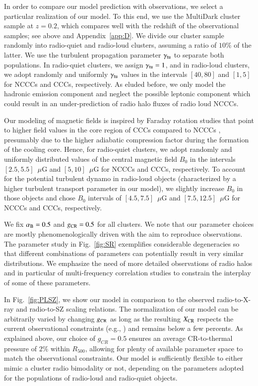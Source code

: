 \documentclass[useAMS,usenatbib]{mn2e}
\begin{document}
In order to compare our model prediction with observations, we select a
particular realization of our model. To this end, we use the MultiDark cluster
sample at $z=0.2$, which compares well with the redshift of the observational
samples; see above and Appendix~\ref{app:D}. We divide our cluster sample
randomly into radio-quiet and radio-loud clusters, assuming a ratio of $10\%$ of
the latter. We use the turbulent propagation parameter $\gamma_{{\mathrm{tu}}}$ to
separate both populations. In radio-quiet clusters, we assign
$\gamma_{{\mathrm{tu}}}=1$, and in radio-loud clusters, we adopt randomly and
uniformly $\gamma_{{\mathrm{tu}}}$ values in the intervals $[40,80]$ and $[1,5]$ for
NCCCs and CCCs, respectively. As eluded before, we only model the hadronic
emission component and neglect the possible leptonic component which could
result in an under-prediction of radio halo fluxes of radio loud NCCCs.

Our modeling of magnetic fields is inspired by Faraday rotation studies that
point to higher field values in the core region of CCCs compared to NCCCs
\citep{2011A&A...529A..13K, 2010A&A...513A..30B}, presumably due to the higher
adiabatic compression factor during the formation of the cooling core. Hence,
for radio-quiet clusters, we adopt randomly and uniformly distributed values of
the central magnetic field $B_0$ in the intervals $[2.5,5.5]$~$\mu$G and
$[5,10]$~$\mu$G for NCCCs and CCCs, respectively. To account for the potential
turbulent dynamo in radio-loud objects (characterized by a higher turbulent
transport parameter in our model), we slightly increase $B_0$ in those objects
and chose $B_0$ intervals of $[4.5,7.5]$~$\mu$G and $[7.5,12.5]$~$\mu$G for
NCCCs and CCCs, respectively.

We fix $\alpha_{{\mathrm{B}}}=0.5$ and $g_{{\mathrm{CR}}}=0.5$ for all clusters. We note
that our parameter choices are mostly phenomenologically driven with the aim to
reproduce observations. The parameter study in Fig.~\ref{fig:SR} exemplifies
considerable degeneracies so that different combinations of parameters can
potentially result in very similar distributions. We emphasize the need of more
detailed observations of radio halos and in particular of multi-frequency
correlation studies to constrain the interplay of some of these parameters.

In Fig.~\ref{fig:PLSZ}, we show our model in comparison to the observed
radio-to-X-ray and radio-to-SZ scaling relations. The normalization of our model
can be arbitrarily varied by changing $g_{{\mathrm{CR}}}$ as long as the resulting
$X_{{\mathrm{CR}}}$ respects the current observational constraints
(e.g., \citealp{2011arXiv1111.5544M}) and remains below a few percents. As
explained above, our choice of $g_{CR}=0.5$ ensures an average CR-to-thermal
pressure of $2\%$ within $R_{500}$, allowing for plenty of available parameter
space to match the observational constraints.  Our model is sufficiently
flexible to either mimic a cluster radio bimodality or not, depending on the
parameters adopted for the populations of radio-loud and radio-quiet
objects. 
\end{document}
